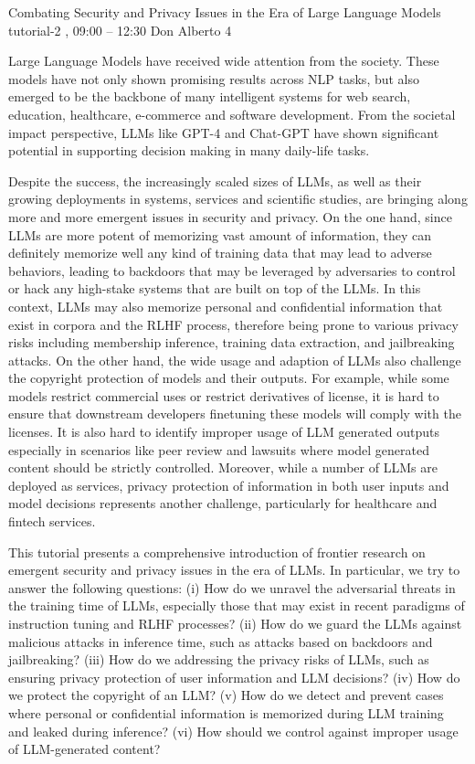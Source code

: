%

\clearpage
\begin{tutorial}
  {Combating Security and Privacy Issues in the Era of Large Language Models}
  {tutorial-2}
  {\daydateyear, 09:00 -- 12:30}
  {Don Alberto 4}

Large Language Models have received wide attention from the society. These models have not only shown promising results across NLP tasks, but also emerged to be the backbone of many intelligent systems for web search, education, healthcare, e-commerce and software development. From the societal impact perspective, LLMs like GPT-4 and Chat-GPT have shown significant potential in supporting decision making in many daily-life tasks.

Despite the success, the increasingly scaled sizes of LLMs, as well as their growing deployments in systems, services and scientific studies, are bringing along more and more emergent issues in security and privacy. On the one hand, since LLMs are more potent of memorizing vast amount of information, they can definitely memorize well any kind of training data that may lead to adverse behaviors, leading to backdoors that may be leveraged by adversaries to control or hack any high-stake systems that are built on top of the LLMs. In this context, LLMs may also memorize personal and confidential information that exist in corpora and the RLHF process, therefore being prone to various privacy risks including membership inference, training data extraction, and jailbreaking attacks. On the other hand, the wide usage and adaption of LLMs also challenge the copyright protection of models and their outputs. For example, while some models restrict commercial uses or restrict derivatives of license, it is hard to ensure that downstream developers finetuning these models will comply with the licenses. It is also hard to identify improper usage of LLM generated outputs especially in scenarios like peer review and lawsuits where model generated content should be strictly controlled. Moreover, while a number of LLMs are deployed as services, privacy protection of information in both user inputs and model decisions represents another challenge, particularly for healthcare and fintech services.

This tutorial presents a comprehensive introduction of frontier research on emergent security and privacy issues in the era of LLMs. In particular, we try to answer the following questions: (i) How do we unravel the adversarial threats in the training time of LLMs, especially those that may exist in recent paradigms of instruction tuning and RLHF processes? (ii) How do we guard the LLMs against malicious attacks in inference time, such as attacks based on backdoors and jailbreaking? (iii) How do we addressing the privacy risks of LLMs, such as ensuring privacy protection of user information and LLM decisions? (iv) How do we protect the copyright of an LLM? (v) How do we detect and prevent cases where personal or confidential information is memorized during LLM training and leaked during inference? (vi) How should we control against improper usage of LLM-generated content?


\end{tutorial}
